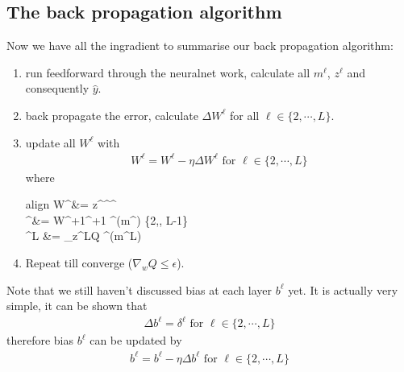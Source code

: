 \documentclass{article} [10pt] %
\begin{document}
\subsection{The back propagation algorithm}
Now we have all the ingradient to summarise our back propagation algorithm:
\begin{enumerate}
	\item run feedforward through the neuralnet work, calculate all $m^\ell$, $z^\ell$ and consequently $\hat{y}$.
	\item back propagate the error, calculate $\Delta W^\ell$ for all $\ell \in \{2, \cdots, L\}$.
	\item update all $W^\ell$ with 
	\begin{align}
		\boxed{W^\ell = W^\ell - \eta\Delta W^\ell \text{ for } \ell \in \{2, \cdots, L\}}
	\end{align}
	where 
	\begin{empheq}[box=\fbox]{align}
		\Delta W^\ell &= z^{}{\delta^{\ell}}^\top  \\
		\delta^\ell &= W^{\ell+1}{\delta^{\ell+1}} \odot {\sigma^{\ell}}^\prime(m^{\ell})  \ell \in \{2,\cdots, L-1\}\\
		\delta^L &= \nabla_{z^L}Q ^\prime(m^L)
	\end{empheq}
	\item Repeat till converge ($\nabla_wQ \leq \epsilon$).
\end{enumerate}
Note that we still haven't discussed bias at each layer $b^\ell$ yet. It is actually very simple, it can be shown that 
\begin{align}
	\boxed{\Delta b^\ell = \delta^\ell \text{ for } \ell \in \{2, \cdots, L\}}
\end{align}
therefore bias $b^\ell$ can be updated by 
\begin{align}
	\boxed{b^\ell = b^\ell - \eta\Delta b^\ell \text{ for } \ell \in \{2, \cdots, L\}}
\end{align}
\end{document}
